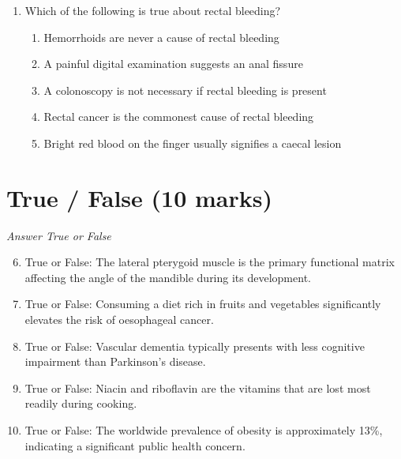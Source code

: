 \documentclass[12pt]{article}
\begin{document}
\begin{enumerate}[label=\arabic*.]
\begin{enumerate}[label=(\alph*)]
    \item Use a syringe to remove the clot.
    \item Remove the catheter and recatheterize.
    \item Replace the catheter with a new one without informing medical staff.
    \item Inform the patient's family.
    \item Inform the patient.
\end{enumerate}
\item Which of the following is true about rectal bleeding?
\begin{enumerate}[label=(\alph*)]
    \item Hemorrhoids are never a cause of rectal bleeding
    \item A painful digital examination suggests an anal fissure
    \item A colonoscopy is not necessary if rectal bleeding is present
    \item Rectal cancer is the commonest cause of rectal bleeding
    \item Bright red blood on the finger usually signifies a caecal lesion
\end{enumerate}
\end{enumerate}

\section*{True / False (10 marks)}
\textit{Answer True or False}
\begin{enumerate}[label=\arabic*.]
\setcounter{enumi}{5}
\item True or False: The lateral pterygoid muscle is the primary functional matrix affecting the angle of the mandible during its development.
\item True or False: Consuming a diet rich in fruits and vegetables significantly elevates the risk of oesophageal cancer.
\item True or False: Vascular dementia typically presents with less cognitive impairment than Parkinson's disease.
\item True or False: Niacin and riboflavin are the vitamins that are lost most readily during cooking.
\item True or False: The worldwide prevalence of obesity is approximately 13\%, indicating a significant public health concern.
\end{enumerate}
\end{document}
